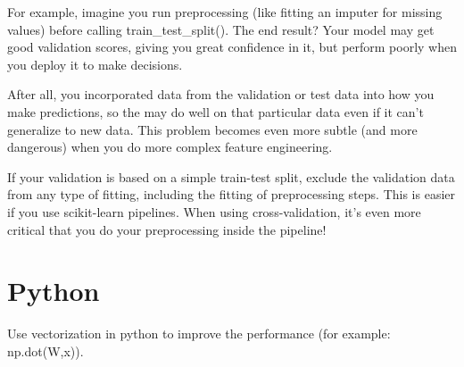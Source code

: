 \documentclass[12pt]{report}
\begin{document}
For example, imagine you run preprocessing (like fitting an imputer for missing values) before calling train\_test\_split(). The end result? Your model may get good validation scores, giving you great confidence in it, but perform poorly when you deploy it to make decisions.

After all, you incorporated data from the validation or test data into how you make predictions, so the may do well on that particular data even if it can't generalize to new data. This problem becomes even more subtle (and more dangerous) when you do more complex feature engineering.

If your validation is based on a simple train-test split, exclude the validation data from any type of fitting, including the fitting of preprocessing steps. This is easier if you use scikit-learn pipelines. When using cross-validation, it's even more critical that you do your preprocessing inside the pipeline!



\section{Python}

Use vectorization in python to improve the performance (for example: np.dot(W,x)).



%


\end{document}
